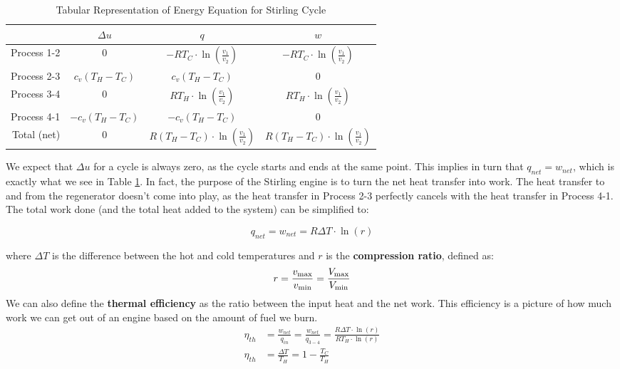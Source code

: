 \begin{table}[H]
  \centering
\def\arraystretch{1.5}
\caption{Tabular Representation of Energy Equation for Stirling Cycle}
\label{tab:ch3_stirling}
\begin{tabular}{r|ccc}
            & $\Delta u$        & $q$                                     & $w$                                    \\ \hline
Process 1-2 & 0                 & $-RT_C\cdot \ln\left(\frac{v_1}{v_2}\right)$ & $-RT_C\cdot \ln\left(\frac{v_1}{v_2}\right)$ \\
Process 2-3 & $ c_v (T_H-T_C)$ & $ c_v (T_H-T_C)$                        & 0                                      \\
Process 3-4 & 0                 &  $RT_H\cdot \ln\left(\frac{v_1}{v_2}\right)$ & $RT_H\cdot \ln\left(\frac{v_1}{v_2}\right)$ \\ 
Process 4-1 & $- c_v (T_H-T_C)$& $- c_v (T_H-T_C)$                        &  0                                    \\ \hhline{=|===}
Total (net) & 0                 & $R(T_H-T_C)\cdot \ln\left(\frac{v_1}{v_2}\right)$ & $R(T_H-T_C)\cdot \ln\left(\frac{v_1}{v_2}\right)$
\end{tabular}
\def\arraystretch{1.0}
\end{table}

We expect that $\Delta u$ for a cycle is always zero, as the cycle starts and ends at the same point.  This implies in turn that $q_{net} = w_{net}$, which is exactly what we see in Table \ref{tab:ch3_stirling}.  In fact, the purpose of the Stirling engine is to turn the net heat transfer into work.  The heat transfer to and from the regenerator doesn't come into play, as the heat transfer in Process 2-3 perfectly cancels with the heat transfer in Process 4-1.  The total work done (and the total heat added to the system) can be simplified to:

\begin{equation} \label{eq:ch3_netWorkStirling}
  q_{net} = w_{net} = R\Delta T\cdot \ln (r)
\end{equation}

where $\Delta T$ is the difference between the hot and cold temperatures and $r$ is the {\bf compression ratio}, defined as:
\begin{equation}\label{eq:ch3_compressionRatio}
  r = \frac{v_{\rm max}}{v_{\rm min}}=\frac{V_{\rm max}}{V_{\rm min}}
\end{equation}
We can also define the {\bf thermal efficiency} as the ratio between the input heat and the net work.  This efficiency is a picture of how much work we can get out of an engine based on the amount of fuel we burn.
\begin{align} \label{eq:ch3_StirlingEfficiency}
  \nonumber \eta_{th} &= \frac{w_{net}}{q_{in}} = \frac{w_{net}}{q_{3-4}} = \frac{R\Delta T\cdot \ln (r)}{RT_H\cdot \ln(r)} \\
  \eta_{th} &= \frac{\Delta T}{T_H} = 1 - \frac{T_C}{T_H}
\end{align}

